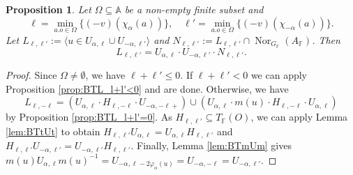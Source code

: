 \documentclass[12pt]{amsart}
\newcommand{\F}{\mathbb{F} }
\newcommand{\A}{\mathbb{A}}
\numberwithin{equation}{section}
\newtheorem{proposition}[theorem]{Proposition}
\theoremstyle{remark} %
\begin{document}
		\begin{proposition}\label{prop:BTL_l+l'}  %
			Let $\Omega \subseteq \A$ be a non-empty finite subset and 
			$$\ell = \min_{a.o \in \Omega} \{ (-v)(\chi_\alpha(a)) \}, \quad \ell' = \min_{a.o \in \Omega} \{ (-v)(\chi_{-\alpha}(a)) \}. 
			$$
			Let 
			$
			L_{\ell,\ell'} := \langle u \in U_{\alpha, \ell} \cup U_{-\alpha, \ell'} \rangle 
			$
			and $N_{\ell, \ell'} := L_{\ell,\ell'} \cap \operatorname{Nor}_{G_\F}(A_\F) $. Then
			$$
			L_{\ell,\ell'} = U_{\alpha, \ell} \cdot U_{-\alpha, \ell'} \cdot N_{\ell,\ell'} .
			$$
		\end{proposition}
		\begin{proof}
			Since $\Omega \neq \emptyset$, we have $\ell + \ell' \leq 0$. If $\ell+\ell' <0$ we can apply Proposition \ref{prop:BTL_l+l'<0} and are done. Otherwise, we have 
			$$
			L_{\ell,-\ell} = (U_{\alpha,\ell}\cdot H_{\ell, -\ell} \cdot U_{-\alpha,-\ell+}) \cup (U_{\alpha,\ell} \cdot m(u) \cdot H_{\ell,-\ell} \cdot U_{\alpha,\ell})
			$$
			by Proposition \ref{prop:BTL_l+l'=0}. As $H_{\ell,\ell'} \subseteq T_\F(O)$, we can apply Lemma \ref{lem:BTtUt} to obtain $H_{\ell,\ell'}U_{\alpha,\ell} = U_{\alpha,\ell}H_{\ell,\ell'}$ and $H_{\ell,\ell'}U_{-\alpha,\ell'} = U_{-\alpha,\ell'} H_{\ell,\ell'}$. Finally, Lemma \ref{lem:BTmUm} gives $m(u) U_{\alpha, \ell} m(u)^{-1} = U_{-\alpha, \ell- 2 \varphi_\alpha(u)} = U_{-\alpha , -\ell} = U_{-\alpha, \ell'}$.
		\end{proof}
		
		
\end{document}
